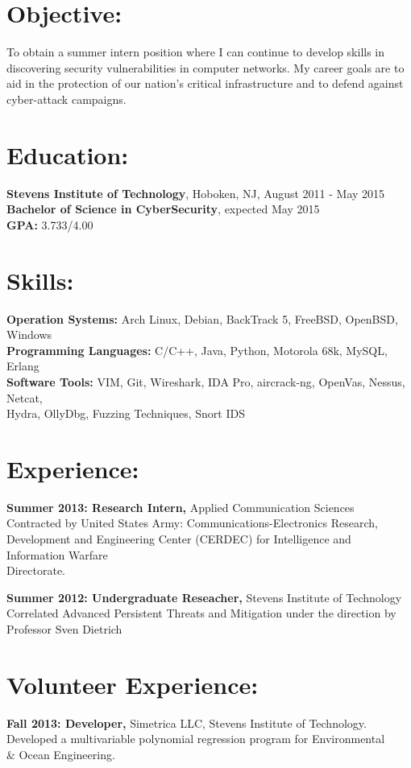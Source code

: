 \documentclass[mm]{res}
\begin{document}
\begin{resume} 
 
\section{Objective:} 
To obtain a summer intern position where I can continue to develop skills in discovering security vulnerabilities in computer networks. My career goals are to aid in the protection of our nation's critical infrastructure and to defend against cyber-attack campaigns.

\section{Education:}
{\bf Stevens Institute of Technology}, Hoboken, NJ, August 2011 - May 2015 \\
{\bf Bachelor of Science in CyberSecurity}, expected May 2015 \\ 
{\bf GPA:} 3.733/4.00

\section{Skills:}
{\bf Operation Systems:} Arch Linux, Debian, BackTrack 5, FreeBSD, OpenBSD, Windows \\
{\bf Programming Languages:} C/C++, Java, Python, Motorola 68k, MySQL, Erlang \\
{\bf Software Tools:} VIM, Git, Wireshark, IDA Pro, aircrack-ng, OpenVas, Nessus, Netcat, \\ 
Hydra, OllyDbg, Fuzzing Techniques, Snort IDS 

\section{Experience:}
 {\bf Summer 2013: Research Intern,} Applied Communication Sciences  
 Contracted by United States Army: Communications-Electronics Research, Development and Engineering Center    (CERDEC) for Intelligence and Information Warfare \\Directorate.
 
{\bf Summer 2012: Undergraduate Reseacher,} Stevens Institute of Technology \\
Correlated Advanced Persistent Threats and Mitigation under the direction by Professor Sven Dietrich

\section{Volunteer Experience:} 
            {\bf Fall 2013: Developer,} Simetrica LLC, Stevens Institute of Technology.\\       
  Developed a multivariable polynomial regression program for Environmental \\ \& Ocean Engineering.
                

\end{resume}
\end{document}
